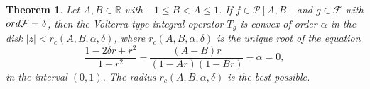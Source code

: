 \documentclass[12pt,a4paper]{amsart}
\numberwithin{equation}{section}
\newtheorem{theorem}{Theorem}[section]
\theoremstyle{remark}
\begin{document}






\begin{theorem}\label{theorem P[A,B] F}
Let $A,B\in\mathbb{R}$ with $-1\le B<A\le 1$.  
If $f\in\mathcal{P}[A,B]$ and $g\in \mathcal{F}$ with ${\rm ord}\mathcal{F}=\delta$,
then the Volterra-type integral operator $T_g$ is convex of order $\alpha$ in the disk $|z|<r_c(A,B,\alpha,\delta)$, where \(r_c(A,B,\alpha,\delta)\) is the unique root of the equation
\begin{equation*}\label{r c alpha gamma corrected final 2}
\frac{1-2\delta r+r^2}{1-r^2}-\frac{(A-B)r}{(1-A r)(1-B r)}-\alpha =0,
\end{equation*}
in the interval $(0,1)$.
The radius $r_c(A,B,\alpha,\delta)$ is the best possible.
\end{theorem}
\end{document}
